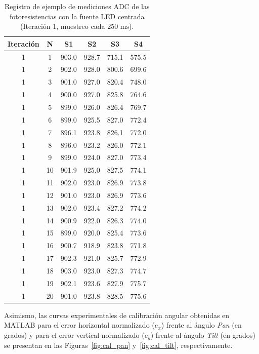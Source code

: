 \documentclass[12pt,a4paper]{article}
\begin{document}
\begin{table}[H]
    \centering
    \caption{Registro de ejemplo de mediciones ADC de las fotoresistencias con la fuente LED centrada (Iteración 1, muestreo cada $250\text{ ms}$).}
    \label{tab:muestra_ldr_centrada}
    \begin{tabular}{cccccc}
        \toprule
        \textbf{Iteración} & \textbf{N} & \textbf{S1} & \textbf{S2} & \textbf{S3} & \textbf{S4} \\
        \midrule
        1 & 1  & 903.0 & 928.7 & 715.1 & 575.5 \\
        1 & 2  & 902.0 & 928.0 & 800.6 & 699.6 \\
        1 & 3  & 901.0 & 927.0 & 820.4 & 748.0 \\
        1 & 4  & 900.0 & 927.0 & 825.8 & 764.6 \\
        1 & 5  & 899.0 & 926.0 & 826.4 & 769.7 \\
        1 & 6  & 899.0 & 925.5 & 827.0 & 772.4 \\
        1 & 7  & 896.1 & 923.8 & 826.1 & 772.0 \\
        1 & 8  & 896.0 & 923.2 & 826.0 & 772.1 \\
        1 & 9  & 899.0 & 924.0 & 827.0 & 773.4 \\
        1 & 10 & 901.9 & 925.0 & 827.5 & 774.1 \\
        1 & 11 & 902.0 & 923.0 & 826.9 & 773.8 \\
        1 & 12 & 901.0 & 923.0 & 826.9 & 773.6 \\
        1 & 13 & 902.0 & 923.4 & 827.2 & 774.2 \\
        1 & 14 & 900.9 & 922.0 & 826.3 & 774.0 \\
        1 & 15 & 899.0 & 920.0 & 825.4 & 773.6 \\
        1 & 16 & 900.7 & 918.9 & 823.8 & 771.8 \\
        1 & 17 & 902.3 & 921.0 & 825.7 & 772.9 \\
        1 & 18 & 903.0 & 923.0 & 827.3 & 774.7 \\
        1 & 19 & 902.1 & 923.6 & 827.9 & 775.7 \\
        1 & 20 & 901.0 & 923.8 & 828.5 & 775.6 \\
        \bottomrule
    \end{tabular}
\end{table}

Asimismo, las curvas experimentales de calibración angular obtenidas en MATLAB para el error horizontal normalizado ($e_x$) frente al ángulo \emph{Pan} (en grados) y para el error vertical normalizado ($e_y$) frente al ángulo \emph{Tilt} (en grados) se presentan en las Figuras~\ref{fig:cal_pan} y~\ref{fig:cal_tilt}, respectivamente.
\end{document}
